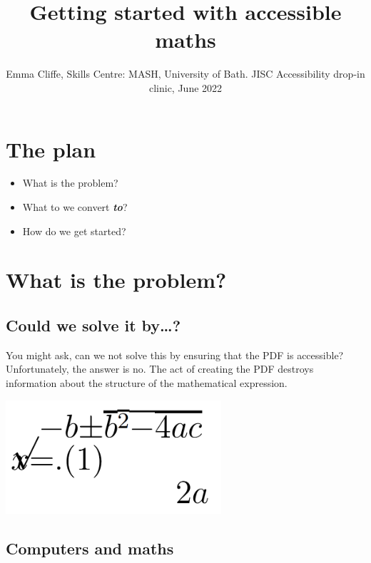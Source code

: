 \documentclass[
  10pt,
  a4paper]{article}
\title{Getting started with accessible maths}
\author{Emma Cliffe, Skills Centre: MASH, University of Bath. JISC Accessibility drop-in clinic, June 2022}
\date{}
\providecommand{\tightlist}{%
  \setlength{\itemsep}{0pt}\setlength{\parskip}{0pt}}
\begin{document}
\maketitle

{
\setcounter{tocdepth}{2}
\tableofcontents
}
\newpage
{}

\hypertarget{the-plan}{%
\section*{The plan}\label{the-plan}}

\begin{itemize}
\tightlist
\item
  What is the problem?
\item
  What to we convert \textbf{\emph{to}}?
\item
  How do we get started?
\end{itemize}

\hypertarget{what-is-the-problem}{%
\section{What is the problem?}\label{what-is-the-problem}}

\hypertarget{could-we-solve-it-by}{%
\subsection{Could we solve it by\ldots?}\label{could-we-solve-it-by}}

You might ask, can we not solve this by ensuring that the PDF is accessible? Unfortunately, the answer is no. The act of creating the PDF destroys information about the structure of the mathematical expression.

\includegraphics[width=0.6\textwidth,height=\textheight]{./reflowing.png}

\hypertarget{computers-and-maths}{%
\subsection{Computers and maths}\label{computers-and-maths}}
\end{document}
